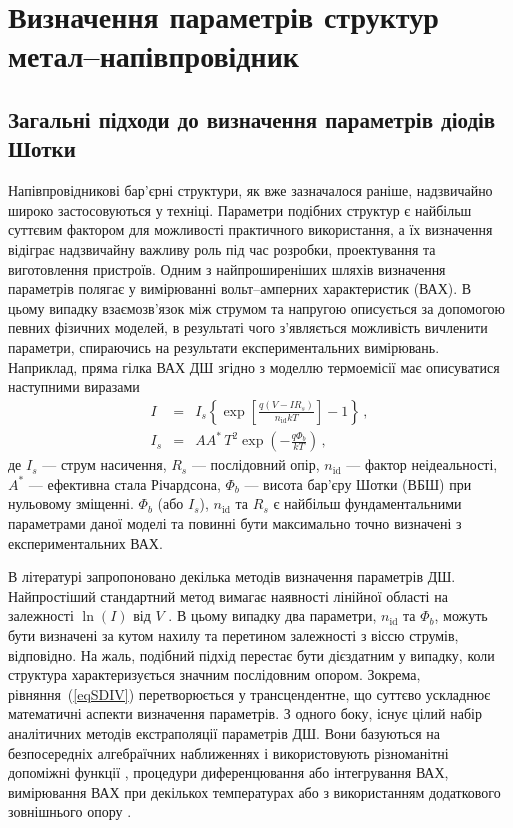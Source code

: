 \chapter{Визначення параметрів структур метал--напівпровідник\label{Ch_MSMethod}}


\section{Загальні підходи до визначення параметрів діодів Шотки}
Напівпровідникові бар'єрні структури, як вже зазначалося раніше, надзвичайно широко застосовуються у техніці.
Параметри подібних структур є найбільш суттєвим фактором для можливості практичного використання,
а їх визначення відіграє надзвичайну важливу роль під час розробки, проектування та виготовлення пристроїв.
Одним з найпроширеніших шляхів визначення параметрів полягає у вимірюванні вольт--амперних характеристик (ВАХ).
В цьому випадку взаємозв'язок між струмом та напругою описується за допомогою певних фізичних моделей, в
результаті чого з'являється можливість вичленити параметри, спираючись на результати експериментальних вимірювань.
Наприклад, пряма гілка ВАХ ДШ згідно з моделлю термоемісії має описуватися \cite{Rhoderick1988} наступними виразами
\begin{eqnarray}
\label{eqSDIV}
I&=&I_s\left\{\exp\left[\frac{q(V-IR_s)}{n_\mathrm{id}kT}\right]-1\right\}\,,\\
\label{eqSDIs}
I_s&=&AA^*\,T^2\exp\left(-\frac{q\Phi_b}{kT}\right)\,,
\end{eqnarray}
де
$I_s$ --- струм насичення,
$R_s$ --- послідовний опір,
$n_\mathrm{id}$ --- фактор неідеальності,
$A^*$ --- ефективна стала Річардсона,
$\Phi_b$ --- висота бар'єру Шотки (ВБШ) при нульовому зміщенні.
$\Phi_b$ (або $I_s$), $n_\mathrm{id}$ та $R_s$ є найбільш фундаментальними параметрами даної моделі та повинні бути максимально точно визначені з експериментальних ВАХ.

В літературі запропоновано декілька методів визначення параметрів ДШ.
Найпростіший стандартний метод вимагає наявності лінійної області на залежності $\ln(I)$ від  $V$ \cite{Sze1985,Rhoderick1988}.
В цьому випадку два параметри, $n_\mathrm{id}$ та $\Phi_b$, можуть бути визначені за кутом нахилу та перетином  залежності з віссю струмів, відповідно.
На жаль, подібний підхід перестає бути дієздатним у випадку, коли структура характеризується значним послідовним опором.
Зокрема, рівняння~(\ref{eqSDIV}) перетворюється у трансцендентне, що суттєво ускладнює математичні аспекти визначення параметрів.
З одного боку, існує цілий набір аналітичних методів екстраполяції параметрів ДШ.
Вони базуються на безпосередніх алгебраїчних наближеннях і використовують різноманітні допоміжні функції \cite{Norde,Lien,Werner,Cheung,Gromov,Lee,Bohlin,Cibils,Manifacier},
процедури  диференцювання  \cite{Mikhelashvili} або інтегрування  \cite{Kaminski,Ortiz1995,Durmus} ВАХ,
вимірювання ВАХ при декількох температурах \cite{Sato} або з використанням додаткового зовнішнього опору \cite{Lyakas}.

